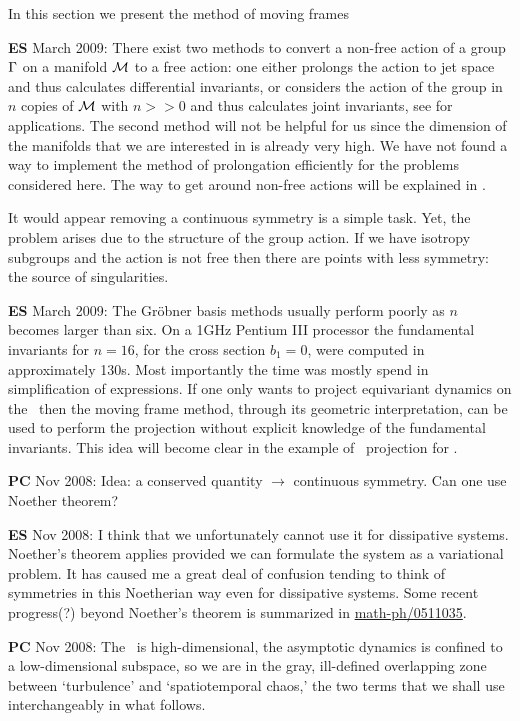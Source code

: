In this section we present the method of moving frames


{\bf ES} March 2009:
There exist two methods to convert a non-free action of a group $\Gamma$ on a manifold $\mathcal{M}$
to a free action: one either prolongs the action to jet space
and thus calculates differential invariants, or considers the
action of the group in $n$ copies of $\mathcal{M}$ with $n>>0$ and
thus calculates joint invariants, see  for
applications. The second method will not be helpful for us
since the dimension of the manifolds that we are interested
in is already very high. We have not found a way to implement
the method of prolongation efficiently for the problems
considered here. The way to get around non-free actions will
be explained in .

It would appear removing a continuous symmetry is a simple
task. Yet, the problem arises due to the structure of the
group action. If we have isotropy subgroups and the action is
not free then there are points with less symmetry: the source
of singularities.

{\bf ES} March 2009:
The Gr\"{o}bner basis methods usually perform poorly as $n$ becomes larger than six. On a 1GHz Pentium III processor the fundamental invariants for $n=16$, for the cross
section $b_1=0$, were computed in approximately 130s. Most importantly the time was mostly
spend in simplification of expressions.
If one only wants to project equivariant dynamics on the \reducedsp\ then the moving frame method,
through its geometric interpretation, can be used to perform the projection without explicit knowledge of the fundamental invariants.
This idea will become clear in the example of \reducedsp\ projection
for \CLe.

{\bf PC} Nov 2008:
Idea: a conserved quantity $\to$ continuous symmetry.
    Can one use Noether theorem?

{\bf ES} Nov 2008:
 I think that we unfortunately cannot use it for
dissipative systems. Noether's theorem applies provided we
can formulate the system as a variational problem. It has
caused me a great deal of confusion tending to think of
symmetries in this Noetherian way even for dissipative
systems. Some recent progress(?) beyond Noether's theorem is
summarized in
\href{http://arxiv.org/abs/math-ph/0511035}{\url{math-ph/0511035}}.

{\bf PC} Nov 2008:
The \statesp\ is
high-dimensional, the asymptotic dynamics is confined to a
low-dimensional subspace, so we are in the gray, ill-defined
overlapping zone between `turbulence' and `spatiotemporal
chaos,' the two terms that we shall use interchangeably in
what follows.

